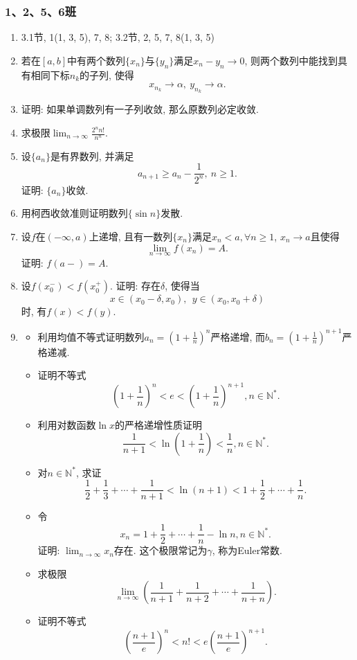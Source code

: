 \documentclass[UTF8,11pt, a4paper, oneside, fontset=none]{ctexbook}
\begin{document}
\subsubsection*{1、2、5、6班}
\begin{enumerate}

\item 3.1节, 1(1, 3, 5), 7, 8; 3.2节, 2, 5, 7, 8(1, 3, 5)

\item 若在$[a, b]$中有两个数列$\{ x_n \}$与$\{ y_n \}$满足$x_n - y_n \to 0$, 则两个数列中能找到具有相同下标$n_k$的子列, 使得
\[
x_{n_k} \to \alpha, \ y_{n_k} \to \alpha.
\]

\item 证明: 如果单调数列有一子列收敛, 那么原数列必定收敛.

\item 求极限$\lim_{n \to \infty} \frac{2^n n!}{n^n}$.

\item 设$\{a_n\}$是有界数列, 并满足
\[
a_{n+1} \geq a_n - \frac{1}{2^n}, \ n \geq 1.
\]
证明: $\{a_n\}$收敛.

\item 用柯西收敛准则证明数列$\{ \sin n \}$发散.

\item 设$f$在$(-\infty, a)$上递增, 且有一数列$\{x_n\}$满足$x_n < a, \forall n \geq 1$, $x _n \to a$且使得
\[
\lim_{n \to \infty}f(x_n) =A.
\]
证明: $f(a-)=A$.

\item 设$f(x_0^-) < f(x_0^+)$. 证明: 存在$\delta$, 使得当
\[
x \in (x_0 - \delta, x_0), \ \ y \in (x_0, x_0 + \delta)
\]
时, 有$f(x) < f(y)$.

\item
\begin{itemize}
\item[(1)] 利用均值不等式证明数列$a_n = \left( 1 + \frac{1}{n}\right)^n$严格递增, 而$b_n = \left( 1 + \frac{1}{n}\right)^{n+1}$严格递减.
\item[(2)] 证明不等式
\[
\left( 1 + \frac{1}{n}\right)^n < e < \left( 1 + \frac{1}{n}\right)^{n+1}, n \in \mathbb N^*.
\]
\item[(3)] 利用对数函数$\ln x$的严格递增性质证明
\[
\frac{1}{n+1} < \ln(1 + \frac{1}{n}) < \frac{1}{n}, n \in \mathbb N^*.
\]
\item[(4)] 对$n \in \mathbb N^*$, 求证
\[
\frac{1}{2} + \frac{1}{3} + \cdots + \frac{1}{n+1} < \ln(n+1) < 1 + \frac{1}{2} + \cdots + \frac{1}{n}.
\]
\item[(5)] 令
\[
x_n = 1 + \frac{1}{2} + \cdots +\frac{1}{n} - \ln n, n \in \mathbb N^*.
\]
证明: $\lim_{n \to \infty} x_n$存在. 这个极限常记为$\gamma$, 称为Euler常数.
\item[(6)] 求极限
\[
\lim_{n \to \infty} \left( \frac{1}{n+1} + \frac{1}{n+2} + \cdots + \frac{1}{n+n}\right).
\]
\item[(7)] 证明不等式
\[
\left( \frac{n+1}{e} \right)^n < n! < e \left( \frac{n+1}{e} \right)^{n+1}.
\]
\end{itemize}

\end{enumerate}
\end{document}
